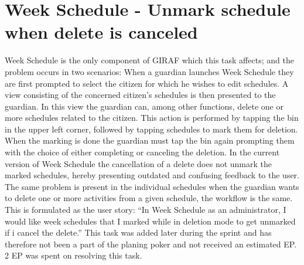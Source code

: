 \section{Week Schedule - Unmark schedule when delete is canceled}
Week Schedule is the only component of GIRAF which this task affects; and the problem occurs in two scenarios:
When a guardian launches Week Schedule they are first prompted to select the citizen for which he wishes to edit schedules.
A view consisting of the concerned citizen's schedules is then presented to the guardian.
In this view the guardian can, among other functions, delete one or more schedules related to the citizen.
This action is performed by tapping the bin in the upper left corner, followed by tapping schedules to mark them for deletion.
When the marking is done the guardian must tap the bin again prompting them with the choice of either completing or canceling the deletion.
In the current version of Week Schedule the cancellation of a delete does not unmark the marked schedules, hereby presenting outdated and confusing feedback to the user.
The same problem is present in the individual schedules when the guardian wants to delete one or more activities from a given schedule, the workflow is the same.
This is formulated as the user story: ``In Week Schedule as an administrator, I would like week schedules that I marked while in deletion mode to get unmarked if i cancel the delete.''
This task was added later during the sprint and has therefore not been a part of the planing poker and not received an estimated EP.
2 EP was spent on resolving this task. 

